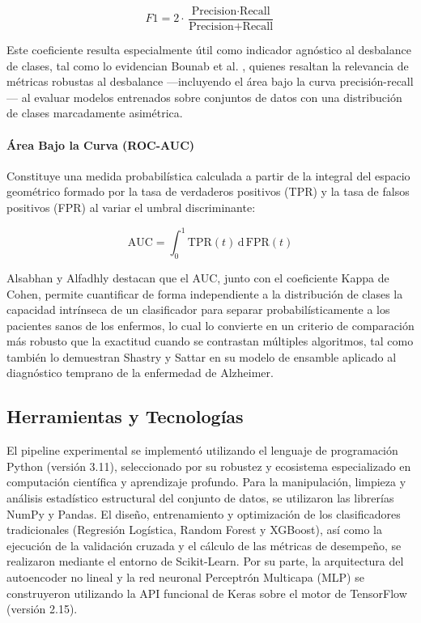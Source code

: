 \documentclass[journal]{IEEEtran}
\begin{document}
\begin{equation}
F1 = 2 \cdot \frac{\text{Precision} \cdot \text{Recall}}{\text{Precision} + \text{Recall}}
\end{equation}

Este coeficiente resulta especialmente útil como indicador agnóstico al desbalance de clases, tal como lo evidencian Bounab et al. \cite{Bounab2024}, quienes resaltan la relevancia de métricas robustas al desbalance —incluyendo el área bajo la curva precisión-recall— al evaluar modelos entrenados sobre conjuntos de datos con una distribución de clases marcadamente asimétrica.

\paragraph{Área Bajo la Curva (ROC-AUC)}
Constituye una medida probabilística calculada a partir de la integral del espacio geométrico formado por la tasa de verdaderos positivos (TPR) y la tasa de falsos positivos (FPR) al variar el umbral discriminante:

\begin{equation}
\text{AUC} = \int_{0}^{1} \text{TPR}(t) \, \mathrm{d}\,\text{FPR}(t)
\end{equation}

Alsabhan y Alfadhly \cite{Alsabhan2025} destacan que el AUC, junto con el coeficiente Kappa de Cohen, permite cuantificar de forma independiente a la distribución de clases la capacidad intrínseca de un clasificador para separar probabilísticamente a los pacientes sanos de los enfermos, lo cual lo convierte en un criterio de comparación más robusto que la exactitud cuando se contrastan múltiples algoritmos, tal como también lo demuestran Shastry y Sattar \cite{Shastry2023} en su modelo de ensamble aplicado al diagnóstico temprano de la enfermedad de Alzheimer.

\subsection{Herramientas y Tecnologías}

El pipeline experimental se implementó utilizando el lenguaje de programación Python (versión 3.11), seleccionado por su robustez y ecosistema especializado en computación científica y aprendizaje profundo. Para la manipulación, limpieza y análisis estadístico estructural del conjunto de datos, se utilizaron las librerías NumPy y Pandas. El diseño, entrenamiento y optimización de los clasificadores tradicionales (Regresión Logística, Random Forest y XGBoost), así como la ejecución de la validación cruzada y el cálculo de las métricas de desempeño, se realizaron mediante el entorno de Scikit-Learn. Por su parte, la arquitectura del autoencoder no lineal y la red neuronal Perceptrón Multicapa (MLP) se construyeron utilizando la API funcional de Keras sobre el motor de TensorFlow (versión 2.15).
\end{document}
